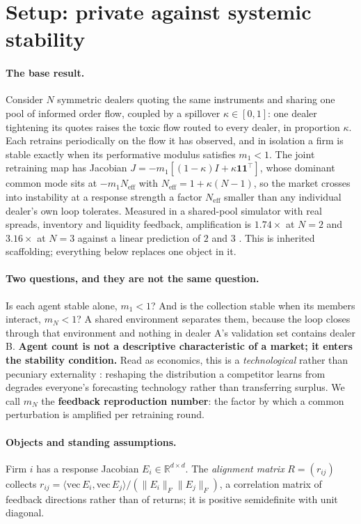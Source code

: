 \documentclass{article}
\theoremstyle{plain}
\theoremstyle{definition}
\newcommand{\Neff}{N_{\mathrm{eff}}}
\newcommand{\mN}{m_N}
\begin{document}
\section{Setup: private against systemic stability}
\label{sec:setup}

\paragraph{The base result.}
Consider $N$ symmetric dealers quoting the same instruments and sharing one pool of informed order flow, coupled by a spillover $\kappa \in [0,1]$: one dealer tightening its quotes raises the toxic flow routed to every dealer, in proportion $\kappa$. Each retrains periodically on the flow it has observed, and in isolation a firm is stable exactly when its performative modulus satisfies $m_1 < 1$. The joint retraining map has Jacobian $J = -m_1[(1-\kappa)I + \kappa \mathbf{1}\mathbf{1}^{\top}]$, whose dominant common mode sits at $-m_1 \Neff$ with $\Neff = 1+\kappa(N-1)$, so the market crosses into instability at a response strength a factor $\Neff$ smaller than any individual dealer's own loop tolerates. Measured in a shared-pool simulator with real spreads, inventory and liquidity feedback, amplification is $1.74\times$ at $N=2$ and $3.16\times$ at $N=3$ against a linear prediction of $2$ and $3$ \citep{reflex2026}. This is inherited scaffolding; everything below replaces one object in it.

\paragraph{Two questions, and they are not the same question.}
Is each agent stable alone, $m_1 < 1$? And is the collection stable when its members interact, $\mN < 1$? A shared environment separates them, because the loop closes through that environment and nothing in dealer A's validation set contains dealer B. \textbf{Agent count is not a descriptive characteristic of a market; it enters the stability condition.} Read as economics, this is a \emph{technological} rather than pecuniary externality \citep{buchanan1962}: reshaping the distribution a competitor learns from degrades everyone's forecasting technology rather than transferring surplus. We call $\mN$ the \textbf{feedback reproduction number}: the factor by which a common perturbation is amplified per retraining round.

\paragraph{Objects and standing assumptions.}
Firm $i$ has a response Jacobian $E_i \in \mathbb{R}^{d\times d}$. The \emph{alignment matrix} $R = (r_{ij})$ collects $r_{ij} = \langle \mathrm{vec}\,E_i, \mathrm{vec}\,E_j\rangle / (\|E_i\|_F \|E_j\|_F)$, a correlation matrix of feedback directions rather than of returns; it is positive semidefinite with unit diagonal.
\end{document}
